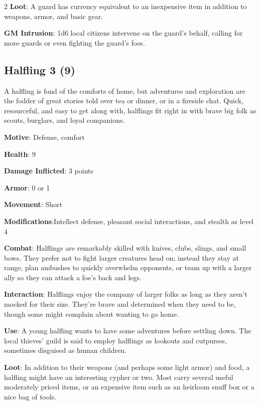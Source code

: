 \begin{multicols}{2}
\textbf{Loot}: A guard has currency equivalent to an inexpensive item in addition to weapons, armor, and basic gear.

\textbf{GM Intrusion}: 1d6 local citizens intervene on the guard’s behalf, calling for more guards or even fighting the guard’s foes.

\subsection{Halfling 3 (9)}

A halfling is fond of the comforts of home, but adventures and exploration are the fodder of great stories told over tea or dinner, or in a fireside chat. Quick, resourceful, and easy to get along with, halflings fit right in with brave big folk as scouts, burglars, and loyal companions. 

\textbf{Motive}: Defense, comfort 

\textbf{Health}: 9 

\textbf{Damage Inflicted}: 3 points 

\textbf{Armor}: 0 or 1 

\textbf{Movement}: Short 

\textbf{Modifications}:Intellect defense, pleasant social interactions, and stealth as level 4 

\textbf{Combat}: Halflings are remarkably skilled with knives, clubs, slings, and small bows. They prefer not to fight larger creatures head on; instead they stay at range, plan ambushes to quickly overwhelm opponents, or team up with a larger ally so they can attack a foe’s back and legs.

\textbf{Interaction}: Halflings enjoy the company of larger folks as long as they aren’t mocked for their size. They’re brave and determined when they need to be, though some might complain about wanting to go home. 

\textbf{Use}: A young halfling wants to have some adventures before settling down. The local thieves’ guild is said to employ halflings as lookouts and cutpurses, sometimes disguised as human children. 

\textbf{Loot}: In addition to their weapons (and perhaps some light armor) and food, a halfling might have an interesting cypher or two. Most carry several useful moderately priced items, or an expensive item such as an heirloom snuff box or a nice bag of tools.


\end{multicols}
